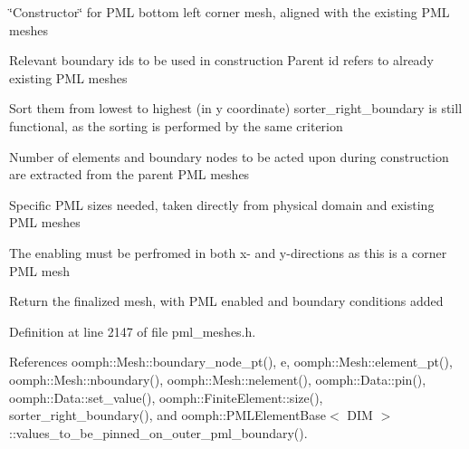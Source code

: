 \char`\"{}\+Constructor\char`\"{} for P\+ML bottom left corner mesh, aligned with the existing P\+ML meshes 

Relevant boundary id\textquotesingle{}s to be used in construction Parent id refers to already existing P\+ML meshes

Sort them from lowest to highest (in y coordinate) sorter\+\_\+right\+\_\+boundary is still functional, as the sorting is performed by the same criterion

Number of elements and boundary nodes to be acted upon during construction are extracted from the \textquotesingle{}parent\textquotesingle{} P\+ML meshes

Specific P\+ML sizes needed, taken directly from physical domain and existing P\+ML meshes

The enabling must be perfromed in both x-\/ and y-\/directions as this is a corner P\+ML mesh

Return the finalized mesh, with P\+ML enabled and boundary conditions added 

Definition at line 2147 of file pml\+\_\+meshes.\+h.



References oomph\+::\+Mesh\+::boundary\+\_\+node\+\_\+pt(), e, oomph\+::\+Mesh\+::element\+\_\+pt(), oomph\+::\+Mesh\+::nboundary(), oomph\+::\+Mesh\+::nelement(), oomph\+::\+Data\+::pin(), oomph\+::\+Data\+::set\+\_\+value(), oomph\+::\+Finite\+Element\+::size(), sorter\+\_\+right\+\_\+boundary(), and oomph\+::\+P\+M\+L\+Element\+Base$<$ D\+I\+M $>$\+::values\+\_\+to\+\_\+be\+\_\+pinned\+\_\+on\+\_\+outer\+\_\+pml\+\_\+boundary().

\mbox{\label{namespaceoomph_1_1TwoDimensionalPMLHelper_acaeafd3af9d2d34e4e7e0f8a2bd78216}} 
